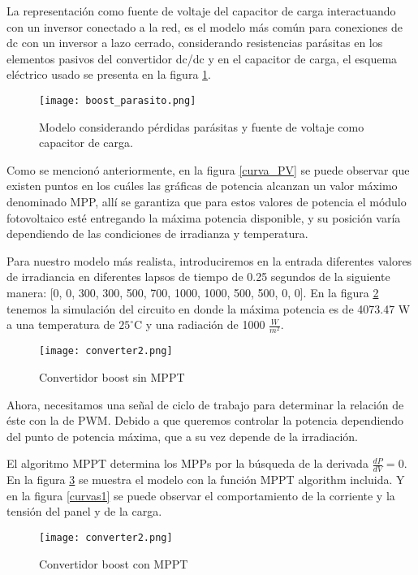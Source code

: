 \documentclass[10pt,twocolumn]{article}
\begin{document}
La representación como fuente de voltaje del capacitor de carga interactuando con un inversor conectado a la red, es el modelo más común para conexiones de dc con un inversor a lazo cerrado, considerando resistencias parásitas en los elementos pasivos del convertidor dc/dc y en el capacitor de carga, el esquema eléctrico usado se presenta en la figura \ref{circuitoboost_completo}.

 \begin{figure}[h]
	\centering
	\texttt{[image: boost\_parasito.png]}
	\caption{Modelo considerando pérdidas parásitas y fuente de voltaje como capacitor de carga.}
	\label{circuitoboost_completo}
\end{figure}

Como se mencionó anteriormente, en la figura \ref{curva_PV} se puede observar que existen puntos en los cuáles las gráficas de potencia alcanzan un valor máximo denominado MPP, allí se garantiza que para estos valores de potencia el módulo fotovoltaico esté entregando la máxima potencia disponible, y su posición varía dependiendo de las condiciones de irradianza y temperatura.

Para nuestro modelo más realista, introduciremos en la entrada diferentes valores de irradiancia en diferentes lapsos de tiempo de 0.25 segundos de la siguiente manera: [0, 0, 300, 300, 500, 700, 1000, 1000, 500, 500, 0, 0]. En la figura \ref{converter1} tenemos la simulación del circuito en donde la máxima potencia es de 4073.47 W a una temperatura de $25^{\circ}$C y una radiación de 1000 $\frac{W}{m^2}$.

 \begin{figure}[h!]
	\centering
	\texttt{[image: converter2.png]}
	\caption{ Convertidor boost sin MPPT}
	\label{converter1}
\end{figure}

Ahora, necesitamos una señal de ciclo de trabajo para determinar la relación de éste con la de PWM. Debido a que queremos controlar la potencia dependiendo del punto de potencia máxima, que a su vez depende de la irradiación.

El algoritmo MPPT determina los MPPs por la búsqueda de la derivada $ \frac{dP}{dV}  = 0$. En la figura \ref{converter2} se muestra el modelo con la función MPPT algorithm incluida. Y en la figura \ref{curvas1} se puede observar el comportamiento de la corriente y la tensión del panel y de la carga.

 \begin{figure}[h!]
	\centering
	\texttt{[image: converter2.png]}
	\caption{Convertidor boost con MPPT}
	\label{converter2}
\end{figure}
\end{document}
